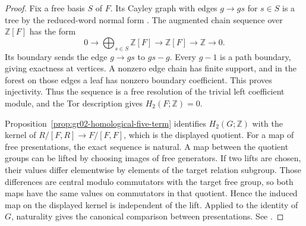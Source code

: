 \begin{proof}
Fix a free basis \(S\) of \(F\). Its Cayley graph with edges
\(g\to gs\) for \(s\in S\) is a tree by the reduced-word normal
form \cite[K07.01.free\_group\_universal\_property]{d07}.
The augmented chain sequence
over \(\mathbb Z[F]\) has the form
\[
 0\to \bigoplus_{s\in S}\mathbb Z[F]\to\mathbb Z[F]\to\mathbb Z\to0 .
\]
Its boundary sends the edge \(g\to gs\) to \(gs-g\).
Every \(g-1\) is a path boundary, giving exactness at vertices.
A nonzero edge chain has finite support, and in the forest on
those edges a leaf has nonzero boundary coefficient. This proves
injectivity. Thus the sequence is a free resolution of the
trivial left coefficient module, and the Tor description
\cite[A10]{homalg} gives \(H_2(F;\mathbb Z)=0\).

Proposition~\ref{prop:gr02-homological-five-term} identifies
\(H_2(G;\mathbb Z)\) with the kernel of \(R/[F,R]\to F/[F,F]\),
which is the displayed quotient. For a map of free presentations,
the exact sequence is natural. A map between the quotient groups
can be lifted by choosing images of free generators. If two lifts
are chosen, their values differ elementwise by elements of the
target relation subgroup. Those differences are central modulo
commutators with the target free group, so both maps have the
same values on commutators in that quotient. Hence the induced map
on the displayed kernel is independent of the lift. Applied to
the identity of \(G\), naturality gives the canonical comparison
between presentations. See \cite[Theorem 6.8.8]{weibel}.
\end{proof}


